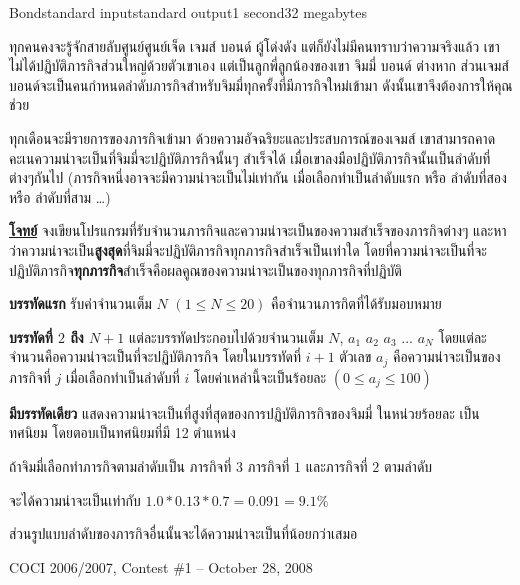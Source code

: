 \documentclass[11pt,a4paper]{article}
\begin{document}
\begin{problem}{Bond}{standard input}{standard output}{1 second}{32 megabytes}

ทุกคนคงจะรู้จักสายลับศูนย์ศูนย์เจ็ด เจมส์ บอนด์ ผู้โด่งดัง แต่ก็ยังไม่มีคนทราบว่าความจริงแล้ว เขาไม่ได้ปฏิบัติภารกิจส่วนใหญ่ด้วยตัวเขาเอง แต่เป็นลูกพี่ลูกน้องของเขา จิมมี่ บอนด์ ต่างหาก ส่วนเจมส์บอนด์จะเป็นคนกำหนดลำดับภารกิจสำหรับจิมมี่ทุกครั้งที่มีภารกิจใหม่เข้ามา ดังนั้นเขาจึงต้องการให้คุณช่วย

ทุกเดือนจะมีรายการของภารกิจเข้ามา ด้วยความอัจฉริยะและประสบการณ์ของเจมส์ เขาสามารถคาดคะเนความน่าจะเป็นที่จิมมี่จะปฏิบัติภารกิจนั้นๆ สำเร็จได้ เมื่อเขาลงมือปฏิบัติภารกิจนั้นเป็นลำดับที่ต่างๆกันไป (ภารกิจหนึ่งอาจจะมีความน่าจะเป็นไม่เท่ากัน เมื่อเลือกทำเป็นลำดับแรก หรือ ลำดับที่สอง หรือ ลำดับที่สาม …)

\bigskip
\underline{\textbf{โจทย์}}  จงเขียนโปรแกรมที่รับจำนวนภารกิจและความน่าจะเป็นของความสำเร็จของภารกิจต่างๆ และหาว่าความน่าจะเป็น\textbf{สูงสุด}ที่จิมมี่จะปฏิบัติภารกิจทุกภารกิจสำเร็จเป็นเท่าใด โดยที่ความน่าจะเป็นที่จะปฏิบัติภารกิจ\textbf{ทุกภารกิจ}สำเร็จคือผลคูณของความน่าจะเป็นของทุกภารกิจที่ปฏิบัติ

\InputFile

\textbf{บรรทัดแรก} รับค่าจำนวนเต็ม $N$ $(1 \leq N \leq 20)$ คือจำนวนภารกิตที่ได้รับมอบหมาย

\textbf{บรรทัดที่ $2$ ถึง $N+1$} แต่ละบรรทัดประกอบไปด้วยจำนวนเต็ม $N$, $a_1$ $a_2$ $a_3$ $...$ $a_N$ โดยแต่ละจำนวนคือความน่าจะเป็นที่จะปฏิบัติภารกิจ โดยในบรรทัดที่ $i+1$ ตัวเลข $a_j$ คือความน่าจะเป็นของภารกิจที่ $j$ เมื่อเลือกทำเป็นลำดับที่ $i$ โดยค่าเหล่านี้จะเป็นร้อยละ $(0 \leq a_j \leq 100)$

\OutputFile

\textbf{มีบรรทัดเดียว} แสดงความน่าจะเป็นที่สูงที่สุดของการปฏิบัติภารกิจของจิมมี่ ในหน่วยร้อยละ เป็นทศนิยม โดยตอบเป็นทศนิยมที่มี 12 ตำแหน่ง

\Examples

\begin{example}
%
%
%
\end{example}

\Note 

ถ้าจิมมี่เลือกทำภารกิจตามลำดับเป็น ภารกิจที่ $3$ ภารกิจที่ $1$ และภารกิจที่ $2$ ตามลำดับ

จะได้ความน่าจะเป็นเท่ากับ $1.0 * 0.13 * 0.7 = 0.091 = 9.1\%$

ส่วนรูปแบบลำดับของภารกิจอื่นนั้นจะได้ความน่าจะเป็นที่น้อยกว่าเสมอ

\Source

COCI 2006/2007, Contest \#1 – October 28, 2008

\end{problem}
\end{document}
